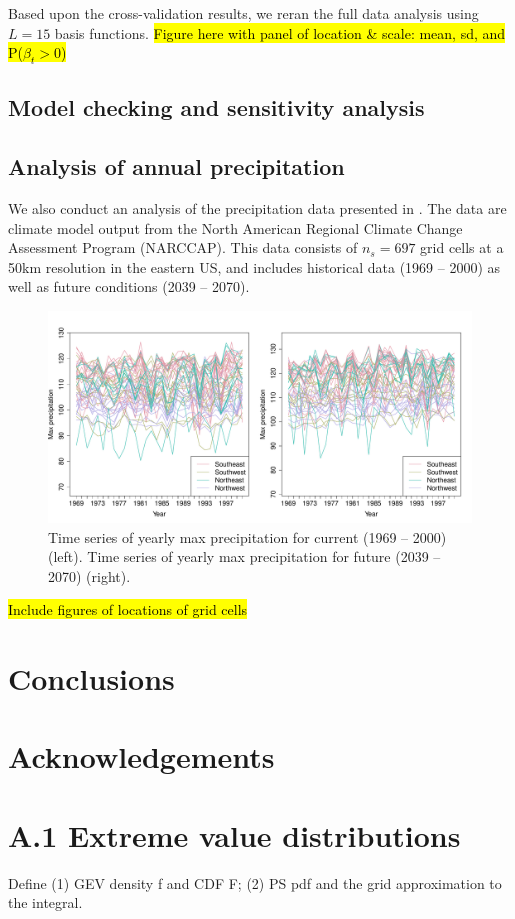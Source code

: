 \documentclass[11pt]{article}
\begin{document}

Based upon the cross-validation results, we reran the full data analysis using $L = 15$ basis functions.
\hl{Figure here with panel of location \& scale: mean, sd, and P($\beta_t > 0$)}


\subsection{Model checking and sensitivity analysis}

\subsection{Analysis of annual precipitation}\label{s:precip}
We also conduct an analysis of the precipitation data presented in \citep{Reich2012}.
The data are climate model output from the North American Regional Climate Change Assessment Program (NARCCAP).
This data consists of $n_s = 697$ grid cells at a 50km resolution in the eastern US, and includes historical data (1969 -- 2000) as well as future conditions (2039 -- 2070).

\begin{figure}  %
  \centering
  \includegraphics[width=\linewidth]{plots/precip-ts}
  \caption{Time series of yearly max precipitation for current (1969 -- 2000) (left). Time series of yearly max precipitation for future (2039 -- 2070) (right).}
\end{figure}

\hl{Include figures of locations of grid cells}

\section{Conclusions}\label{s:con}

\section*{Acknowledgements}

\section*{A.1 Extreme value distributions}
Define (1) GEV density f and CDF F; (2) PS pdf  and the grid approximation to the integral.

\begin{singlespace}


\end{singlespace}
\end{document}
